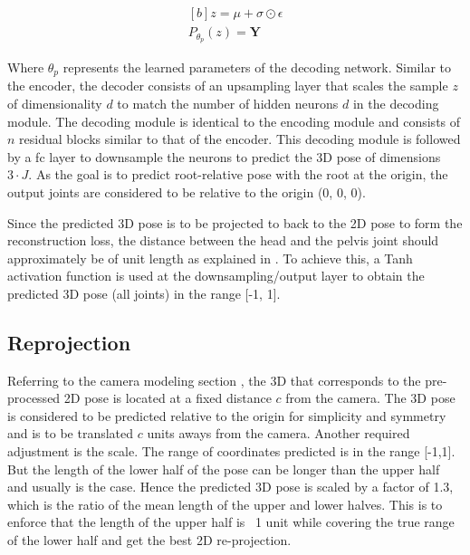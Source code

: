 \begin{equation} \label{eqn:P_fn}
    \begin{gathered}[b]
        z = \mu + \sigma \odot \epsilon \\
        P_{\theta_p}(z) = \textbf{Y}
    \end{gathered}
\end{equation}

Where $\theta_p$ represents the learned parameters of the decoding network. Similar to the encoder, the decoder consists of an upsampling layer that scales the sample $z$ of dimensionality $d$ to match the number of hidden neurons $d$ in the decoding module. The decoding module is identical to the encoding module and consists of $n$ residual blocks similar to that of the encoder. This decoding module is followed by a \ac{fc} layer to downsample the neurons to predict the 3D pose of dimensions $3\!\cdot\!J$. As the goal is to predict root-relative pose with the root at the origin, the output joints are considered to be relative to the origin (0, 0, 0).

Since the predicted 3D pose is to be projected to back to the 2D pose to form the reconstruction loss, the distance between the head and the pelvis joint should approximately be of unit length as explained in . To achieve this, a Tanh activation function is used at the downsampling/output layer to obtain the predicted 3D pose (all joints) in the range [-1, 1].

\subsection{Reprojection}
\label{subsec:reproject}
Referring to the camera modeling section , the 3D that corresponds to the pre-processed 2D pose is located at a fixed distance $c$ from the camera. The 3D pose is considered to be predicted relative to the origin for simplicity and symmetry and is to be translated $c$ units aways from the camera. Another required adjustment is the scale. The range of coordinates predicted is in the range [-1,1]. But the length of the lower half of the pose can be longer than the upper half and usually is the case. Hence the predicted 3D pose is scaled by a factor of 1.3, which is the ratio of the mean length of the upper and lower halves. This is to enforce that the length of the upper half is ~1 unit while covering the true range of the lower half and get the best 2D re-projection.

